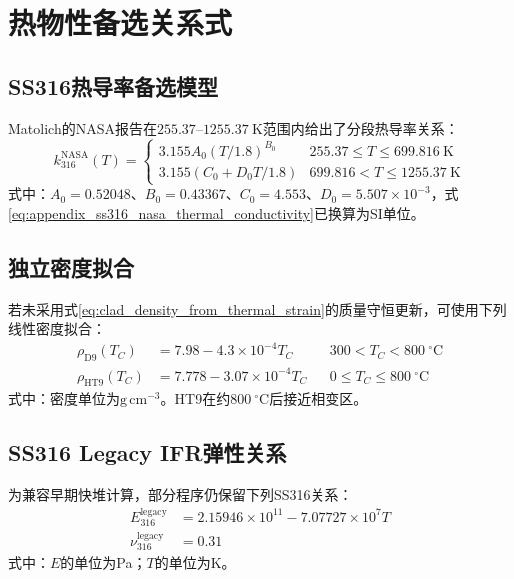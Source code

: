 \section{热物性备选关系式}
\label{app:cladding_alternative_thermal_models}

\subsection{SS316热导率备选模型}

Matolich的NASA报告在$255.37$--$1255.37\ \mathrm{K}$范围内给出了分段热导率关系\cite{matolich1965thermal}：
\begin{equation}
	k_{316}^{\mathrm{NASA}}(T)
	=\begin{cases}
		3.155A_0(T/1.8)^{B_0}
		&255.37\leq T\leq699.816\ \mathrm{K}\\
		3.155\left(C_0+D_0T/1.8\right)
		&699.816<T\leq1255.37\ \mathrm{K}
	\end{cases}
	\label{eq:appendix_ss316_nasa_thermal_conductivity}
\end{equation}
\noindent 式中：$A_0=0.52048$、$B_0=0.43367$、$C_0=4.553$、$D_0=5.507\times10^{-3}$，式\eqref{eq:appendix_ss316_nasa_thermal_conductivity}已换算为SI单位。

\subsection{独立密度拟合}

若未采用式\eqref{eq:clad_density_from_thermal_strain}的质量守恒更新，可使用下列线性密度拟合：
\begin{equation}
	\label{eq:appendix_cladding_density_fits}
	\begin{aligned}
		\rho_{\mathrm{D9}}(T_C)
		&=7.98-4.3\times10^{-4}T_C
		&&300<T_C<800\ ^\circ\mathrm C\\
		\rho_{\mathrm{HT9}}(T_C)
		&=7.778-3.07\times10^{-4}T_C
		&&0\leq T_C\leq800\ ^\circ\mathrm C
	\end{aligned}
\end{equation}
\noindent 式中：密度单位为$\mathrm{g\,cm^{-3}}$。HT9在约$800\ ^\circ\mathrm C$后接近相变区。

\subsection{SS316 Legacy IFR弹性关系}

为兼容早期快堆计算，部分程序仍保留下列SS316关系：
\begin{equation}
	\label{eq:appendix_ss316_legacy_elasticity}
	\begin{aligned}
		E_{316}^{\mathrm{legacy}}
		&=2.15946\times10^{11}-7.07727\times10^7T\\
		\nu_{316}^{\mathrm{legacy}}&=0.31
	\end{aligned}
\end{equation}
\noindent 式中：$E$的单位为Pa；$T$的单位为K。

